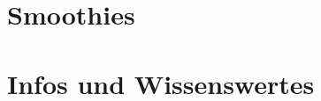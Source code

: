 \documentclass[a4paper]{scrartcl}
\begin{document}
\section{Smoothies} %


\section{Infos und Wissenswertes} %
%
	

\end{document}
